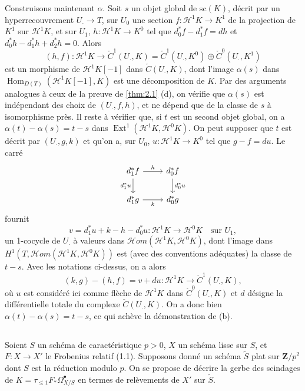 \documentclass[12pt,a4paper]{article}
\theoremstyle{plain}
\theoremstyle{definition}
\theoremstyle{remark}
\DeclareMathOperator{\Hom}{Hom}
\DeclareMathOperator{\Ext}{Ext}
\begin{document}
Construisons maintenant $\alpha$. Soit $s$ un objet global de $\mathrm{sc}(K)$, d\'ecrit par un hyperrecouvrement $U_\cdot \to T$, sur $U_0$ une section $f: \mathscr{H}^1 K \to K^1$ de la projection de $K^1$ sur $\mathscr{H}^1 K$, et sur $U_1$, $h: \mathscr{H}^1 K \to K^0$ tel que $d_0^* f - d_1^* f = dh$ et $d_0^* h - d_1^* h + d_2^* h = 0$. Alors
\[
(h, f): \mathscr{H}^1 K \to \check{C}^1(U_\cdot, K) = \check{C}^1(U_\cdot, K^0) \oplus \check{C}^0(U_\cdot, K^1)
\]
est un morphisme de $\mathscr{H}^1 K[-1]$ dans $\check{C}(U_\cdot, K)$, dont l'image $\alpha(s)$ dans $\Hom_{D(T)}(\mathscr{H}^1 K[-1], K)$ est une d\'ecomposition de $K$. Par des arguments analogues \`a ceux de la preuve de \ref{thm:2.1} (d), on v\'erifie que $\alpha(s)$ est ind\'ependant des choix de $(U_\cdot, f, h)$, et ne d\'epend que de la classe de $s$ \`a isomorphisme pr\`es. Il reste \`a v\'erifier que, si $t$ est un second objet global, on a $\alpha(t) - \alpha(s) = t - s$ dans $\Ext^1(\mathscr{H}^1 K, \mathscr{H}^0 K)$. On peut supposer que $t$ est d\'ecrit par $(U_\cdot, g, k)$ et qu'on a, sur $U_0$, $u: \mathscr{H}^1 K \to K^0$ tel que $g - f = du$. Le carr\'e
\[
\begin{tikzcd}
d_1^* f \arrow[r, "h"] \arrow[d, "d_1^* u"'] & d_0^* f \arrow[d, "d_0^* u"] \\
d_1^* g \arrow[r, "k"'] & d_0^* g
\end{tikzcd}
\]
fournit
\[
v = d_1^* u + k - h - d_0^* u: \mathscr{H}^1 K \to \mathscr{H}^0 K \quad \text{sur } U_1,
\]
un 1-cocycle de $U_\cdot$ \`a valeurs dans $\mathscr{H}om(\mathscr{H}^1 K, \mathscr{H}^0 K)$, dont l'image dans $H^1(T, \mathscr{H}om(\mathscr{H}^1 K, \mathscr{H}^0 K))$ est (avec des conventions ad\'equates) la classe de $t - s$. Avec les notations ci-dessus, on a alors
\[
(k,g) - (h,f) = v + du: \mathscr{H}^1 K \to \check{C}^1(U_\cdot, K),
\]
o\`u $u$ est consid\'er\'e ici comme fl\`eche de $\mathscr{H}^1 K$ dans $\check{C}^0(U_\cdot, K)$ et $d$ d\'esigne la diff\'erentielle totale du complexe $\check{C}(U_\cdot, K)$. On a donc bien $\alpha(t) - \alpha(s) = t - s$, ce qui ach\`eve la d\'emonstration de (b).

\subsection{}

Soient $S$ un sch\'ema de caract\'eristique $p > 0$, $X$ un sch\'ema lisse sur $S$, et $F: X \to X'$ le Frobenius relatif (1.1). Supposons donn\'e un sch\'ema $\tilde{S}$ plat sur $\mathbf{Z}/p^2$ dont $S$ est la r\'eduction modulo $p$. On se propose de d\'ecrire la gerbe des scindages de $K = \tau_{\le 1} F_* \Omega^{\bullet}_{X/S}$ en termes de rel\`evements de $X'$ sur $\tilde{S}$.
\end{document}
